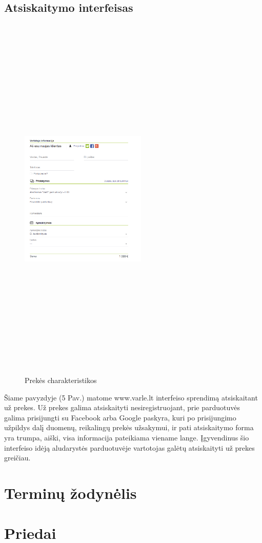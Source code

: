 \documentclass[oneside]{VUMIFPSkursinis}
\begin{document}
	
	\subsection{Atsiskaitymo interfeisas}
		\begin{figure}[h]
			\centering
			\includegraphics[width=6cm,height=18cm,keepaspectratio]{IkvepiantisInterfeisas5.png}
			\caption{ Prekės charakteristikos}
		\end{figure}

			Šiame pavyzdyje (5 Pav.) matome www.varle.lt interfeiso sprendimą atsiskaitant už prekes. 
			Už prekes galima atsiskaityti nesiregistruojant, prie parduotuvės galima prisijungti su Facebook arba Google paskyra, kuri po prisijungimo užpildys dalį duomenų, reikalingų prekės užsakymui, ir pati atsiskaitymo forma yra trumpa, aiški, visa informacija pateikiama viename lange. 
			Įgyvendinus šio interfeiso idėją aludarystės parduotuvėje vartotojas galėtų atsiskaityti už prekes greičiau.


\section{Terminų žodynėlis}
\section{Priedai}
\end{document}
